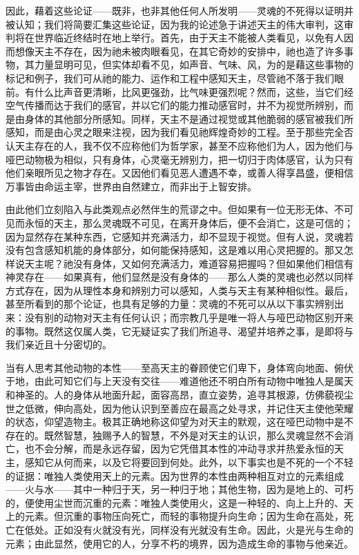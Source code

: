 因此，藉着这些论证——既非，也非其他任何人所发明——灵魂的不死得以证明并被认知；我们将简要汇集这些论证，因为我的论述急于讲述天主的伟大审判，这审判将在世界临近终结时在地上举行。首先，由于天主不能被人类看见，以免有人因而想像天主不存在，因为祂未被肉眼看见，在其它奇妙的安排中，祂也造了许多事物，其力量显明可见，但实体却看不见，如声音、气味、风，为的是藉这些事物的标记和例子，我们可从祂的能力、运作和工程中感知天主，尽管祂不落于我们眼前。有什么比声音更清晰，比风更强劲，比气味更强烈呢？然而，这些，当它们经空气传播而达于我们的感官，并以它们的能力推动感官时，并不为视觉所辨别，而是由身体的其他部分所感知。同样，天主不是通过视觉或其他脆弱的感官被我们所感知，而是由心灵之眼来注视，因为我们看见祂辉煌奇妙的工程。至于那些完全否认天主存在的人，我不仅不应称他们为哲学家，甚至不应称他们为人，因为他们与哑巴动物极为相似，只有身体，心灵毫无辨别力，把一切归于肉体感官，认为只有他们亲眼所见之物才存在。又因他们看见恶人遭遇不幸，或善人得享昌盛，便相信万事皆由命运主宰，世界由自然建立，而非出于上智安排。\par

由此他们立刻陷入与此类观点必然伴生的荒谬之中。但如果有一位无形无体、不可见而永恒的天主，那么灵魂既不可见，在离开身体后，便不会消亡，这是可信的；因为显然存在某种东西，它感知并充满活力，却不显现于视觉。但有人说，灵魂若没有包含感知机能的身体部分，如何能保持感知，这是难以用心灵把握的。那又怎样说天主呢？祂没有身体，又如何充满活力，难道容易把握吗？但如果他们相信有神灵存在——如果真有，他们显然是没有身体的——那么人类的灵魂也必然以同样方式存在，因为从理性本身和辨别力可以感知，人类与天主有某种相似性。最后，甚至所看到的那个论证，也具有足够的力量：灵魂的不死可以从以下事实辨别出来：没有别的动物对天主有任何认识；而宗教几乎是唯一将人与哑巴动物区别开来的事物。既然这仅属人类，它无疑证实了我们所追寻、渴望并培养之事，是即将与我们亲近且十分密切的。\par

当有人思考其他动物的本性——至高天主的眷顾使它们卑下，身体弯向地面、俯伏于地，由此可知它们与上天没有交往——难道他还不明白所有动物中唯独人是属天和神圣的。人的身体从地面升起，面容高昂，直立姿势，追寻其根源，仿佛藐视尘世之低微，伸向高处，因为他认识到至善应在最高之处寻求，并记住天主使他荣耀的状态，仰望造物主。极其正确地称这仰望为对天主的默观，这在哑巴动物中是不存在的。既然智慧，独赐予人的智慧，不外是对天主的认识，那么灵魂显然不会消亡，也不会分解，而是永远存留，因为它凭借其本性的冲动寻求并热爱永恒的天主，感知它从何而来，以及它将要回到何处。此外，以下事实也是不死的一个不轻的证据：唯独人类使用天上的元素。因为世界的本性由两种相互对立的元素组成——火与水——其中一种归于天，另一种归于地；其他生物，因为是地上的、可朽的，便使用尘世而沉重的元素：唯独人类使用火，这是一种轻的、向上上升的、天上的元素。但沉重的事物压向死亡，而轻的事物提升向生命；因为生命在高处，死亡在低处。正如没有火就没有光，同样没有光就没有生命。因此，火是光与生命的元素；由此显然，使用它的人，分享不朽的境界，因为造成生命的事物与他亲近。\par

